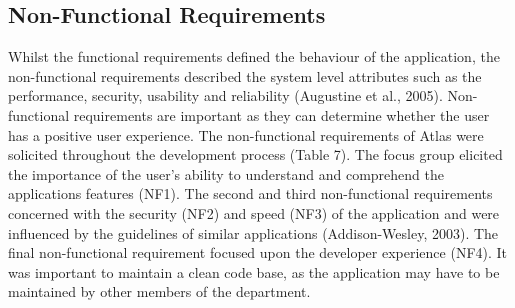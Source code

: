 \documentclass{article}
\begin{document}
\subsection{Non-Functional Requirements}

Whilst the functional requirements defined the behaviour of the application, the non-functional requirements described the system level attributes such as the performance, security, usability and reliability (Augustine et al., 2005). Non-functional requirements are important as they can determine whether the user has a positive user experience. The non-functional requirements of Atlas were solicited throughout the development process (Table 7). The focus group elicited the importance of the user’s ability to understand and comprehend the applications features (NF1). The second and third non-functional requirements concerned with the security (NF2) and speed (NF3) of the application and were influenced by the guidelines of similar applications (Addison-Wesley, 2003). The final non-functional requirement focused upon the developer experience (NF4). It was important to maintain a clean code base, as the application may have to be maintained by other members of the department. 

\begin{table}[!hb]
\footnotesize
\caption{The non-functional requirements of Atlas were solicited to provide a smooth user and developer experience.}
\centering
\label{tab:my-table}
\end{table}
\end{document}
